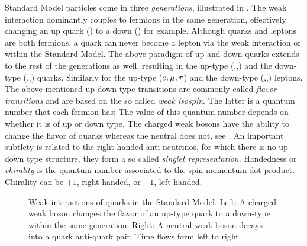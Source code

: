 Standard Model particles come in three {\it generations}, illustrated in .
The weak interaction dominantly couples to fermions in the same generation, effectively changing an up quark (\uquark) to a down (\dquark) for example.
Although quarks and leptons are both fermions, a quark can never become a lepton via the weak interaction or \viceversa within the Standard Model.
The above paradigm of up and down quarks extends to the rest of the generations as well, resulting in the up-type (\uquark,\cquark,\tquark)
and the down-type (\dquark,\squark,\bquark) quarks. Similarly for the  up-type ($e,\mu,\tau$) and the down-type (\neue,\neum,\neut)
leptons. The above-mentioned up-down type transitions are commonly called {\it flavor transitions} and are based on the so called
{\it weak isospin}. The latter is a quantum number that each fermion has; The value of this quantum number depends on whether it is of up or down type.
The charged weak bosons \Wpm have the ability to change the flavor of quarks whereas the neutral \Z does not, see .
An important subtlety is related to the right handed anti-neutrinos, for which there is no up-down type structure,
\ie they form a so called {\it singlet representation}. Handedness or {\it chirality} is the quantum number associated to the
spin-momentum dot product. Chirality can be $+1$, right-handed, or $-1$, left-handed.

\begin{figure}[t]
  \centering
  \begin{subfigure}{0.49\textwidth}
    \hspace{1.3cm}
    \scalebox{1.}{}
    \caption{}
    \label{CC_WeakInteractions}
  \end{subfigure}%
  \hfill%
  \begin{subfigure}{0.49\textwidth}
    \hspace{1.3cm}
    \scalebox{1.}{}
    \caption{}
    \label{NC_WeakInteractions}
  \end{subfigure}
  \caption{Weak interactions of quarks in the Standard Model. Left: A charged weak boson changes the flavor
           of an up-type quark to a down-type within the same generation.
           Right: A neutral weak boson decays into a quark anti-quark pair. Time flows form left to right.}
\label{WeakInteractions}
\end{figure}

